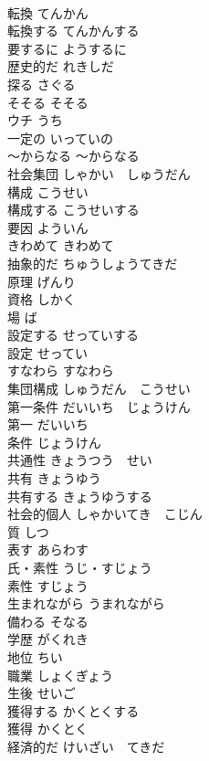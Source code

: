 \documentclass[8pt]{extreport}
\begin{document}
\begin{CJK}{UTF8}{min}
\\	転換	てんかん	
\\	転換する	てんかんする	
\\	要するに	ようするに	
\\	歴史的だ	れきしだ	
\\	探る	さぐる	
\\	そそる	そそる	
\\	ウチ	うち	
\\	一定の	いっていの	
\\	〜からなる	〜からなる	
\\	社会集団	しゃかい　しゅうだん	
\\	構成	こうせい	
\\	構成する	こうせいする	
\\	要因	よういん	
\\	きわめて	きわめて	
\\	抽象的だ	ちゅうしょうてきだ	
\\	原理	げんり	
\\	資格	しかく	
\\	場	ば	
\\	設定する	せっていする	
\\	設定	せってい	
\\	すなわら	すなわら	
\\	集団構成	しゅうだん　こうせい	
\\	第一条件	だいいち　じょうけん	
\\	第一	だいいち	
\\	条件	じょうけん	
\\	共通性	きょうつう　せい	
\\	共有	きょうゆう	
\\	共有する	きょうゆうする	
\\	社会的個人	しゃかいてき　こじん	
\\	質	しつ	
\\	表す	あらわす	
\\	氏・素性	うじ・すじょう	
\\	素性	すじょう	
\\	生まれながら	うまれながら	
\\	備わる	そなる	
\\	学歴	がくれき	
\\	地位	ちい	
\\	職業	しょくぎょう	
\\	生後	せいご	
\\	獲得する	かくとくする	
\\	獲得	かくとく	
\\	経済的だ	けいざい　てきだ	

\end{CJK}
\end{document}
